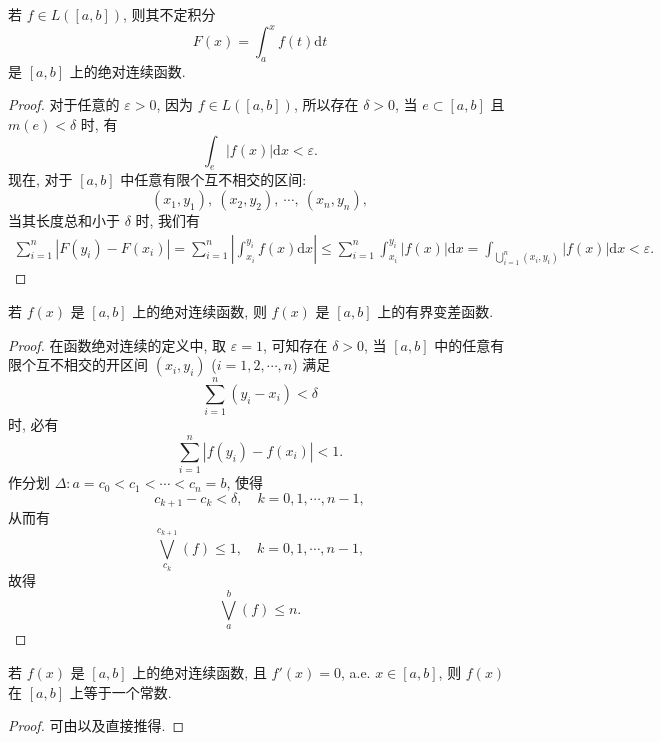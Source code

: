 \documentclass[../../main.tex]{subfiles}%
\begin{document}
\begin{theorem}\label{theorem:实变函数-变上限积分都是绝对连续函数}
若 $f\in L([a,b])$, 则其不定积分
\[
F(x) = \int_a^x f(t)\mathrm{d}t
\]
是 $[a,b]$ 上的绝对连续函数.
\end{theorem}
\begin{proof}
对于任意的 $\varepsilon>0$, 因为 $f\in L([a,b])$, 所以存在 $\delta>0$, 当 $e\subset[a,b]$ 且 $m(e)<\delta$ 时, 有
\[
\int_e |f(x)|\mathrm{d}x < \varepsilon.
\]
现在, 对于 $[a,b]$ 中任意有限个互不相交的区间:
\[
(x_1,y_1),\ (x_2,y_2),\ \cdots,\ (x_n,y_n),
\]
当其长度总和小于 $\delta$ 时, 我们有
\begin{align*}
\sum_{i=1}^n |F(y_i)-F(x_i)| = \sum_{i=1}^n \left|\int_{x_i}^{y_i} f(x)\mathrm{d}x\right| \leqslant \sum_{i=1}^n \int_{x_i}^{y_i} |f(x)|\mathrm{d}x 
= \int_{\bigcup_{i=1}^n (x_i,y_i)} |f(x)|\mathrm{d}x < \varepsilon.
\end{align*}
\end{proof}

\begin{theorem}\label{theorem:AC一定BV}
若 $f(x)$ 是 $[a,b]$ 上的绝对连续函数, 则 $f(x)$ 是 $[a,b]$ 上的有界变差函数.
\end{theorem}
\begin{proof}
在函数绝对连续的定义中, 取 $\varepsilon=1$, 可知存在 $\delta>0$, 当 $[a,b]$ 中的任意有限个互不相交的开区间 $(x_i,y_i)$ ($i=1,2,\cdots,n$) 满足
\[
\sum_{i=1}^n (y_i-x_i) < \delta
\]
时, 必有
\[
\sum_{i=1}^n |f(y_i)-f(x_i)| < 1.
\]
作分划 $\Delta: a=c_0 < c_1 < \cdots < c_n = b$, 使得
\[
c_{k+1}-c_k < \delta,\quad k=0,1,\cdots,n-1,
\]
从而有
\[
\bigvee_{c_k}^{c_{k+1}}(f) \leqslant 1,\quad k=0,1,\cdots,n-1,
\]
故得
\[
\bigvee_a^b(f) \leqslant n.
\]
\end{proof}

\begin{theorem}
若 $f(x)$ 是 $[a,b]$ 上的绝对连续函数, 且 $f'(x)=0$, a.e. $x\in[a,b]$, 则 $f(x)$ 在 $[a,b]$ 上等于一个常数.
\end{theorem}
\begin{proof}
可由以及直接推得.
\end{proof}
\end{document}
